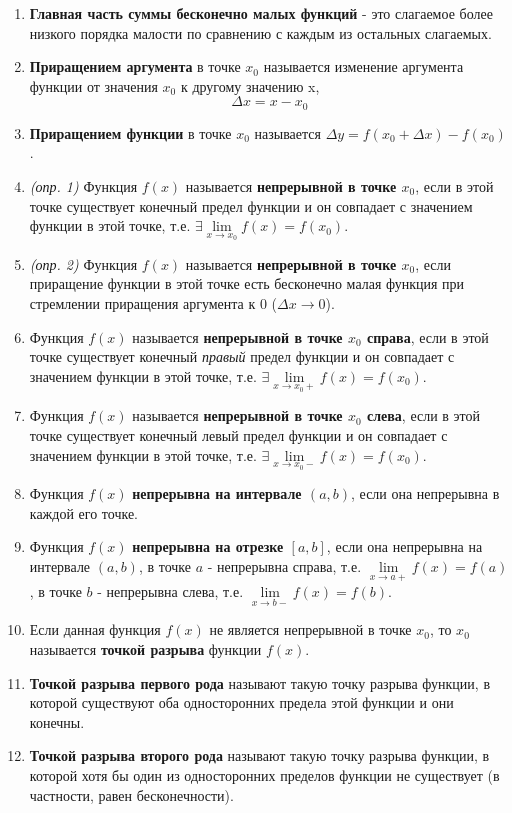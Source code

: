 \begin{enumerate}
\item \textbf{Главная часть суммы бесконечно малых функций} - это слагаемое более низкого порядка малости по сравнению с каждым из остальных слагаемых.
\item \textbf{Приращением аргумента} в точке $x_0$ называется изменение аргумента функции от значения $x_0$ к другому значению x, $$\Delta x = x - x_0$$
\item \textbf{Приращением функции} в точке $x_0$ называется $\Delta y = f(x_0 + \Delta x) - f(x_0)$.
\item \textit{(опр. 1)} Функция $f(x)$ называется \textbf{непрерывной в точке $x_0$}, если в этой точке существует конечный предел функции и он совпадает с значением функции в этой точке, т.е. $\exists \lim\limits_{x \to x_0}f(x) = f(x_0)$.
\item \textit{(опр. 2)} Функция $f(x)$ называется \textbf{непрерывной в точке $x_0$}, если приращение функции в этой точке есть бесконечно малая функция при стремлении приращения аргумента к 0 ($\Delta x \rightarrow 0$).
\item Функция $f(x)$ называется \textbf{непрерывной в точке $x_0$ справа}, если в этой точке существует конечный \textit{правый} предел функции и он совпадает с значением функции в этой точке, т.е. $\exists \lim\limits_{x \to x_0+}f(x) = f(x_0)$.
\item Функция $f(x)$ называется \textbf{непрерывной в точке $x_0$ слева}, если в этой точке существует конечный левый предел функции и он совпадает с значением функции в этой точке, т.е. $\exists \lim\limits_{x \to x_0-}f(x) = f(x_0)$.
\item Функция $f(x)$ \textbf{непрерывна на интервале $(a, b)$}, если она непрерывна в каждой его точке.
\item Функция $f(x)$ \textbf{непрерывна на отрезке $[a, b]$}, если она непрерывна на интервале $(a, b)$, в точке $a$ - непрерывна справа, т.е. $\lim\limits_{x \to a+}f(x) = f(a)$, в точке $b$ - непрерывна слева, т.е. $\lim\limits_{x \to b-}f(x) = f(b)$.
\item Если данная функция $f(x)$ не является непрерывной в точке $x_0$, то $x_0$ называется \textbf{точкой разрыва} функции $f(x)$.
\item \textbf{Точкой разрыва первого рода} называют такую точку разрыва функции, в которой существуют оба односторонних предела этой функции и они конечны.
\item \textbf{Точкой разрыва второго рода} называют такую точку разрыва функции, в которой хотя бы один из односторонних пределов функции не существует (в частности, равен бесконечности).

\end{enumerate}
